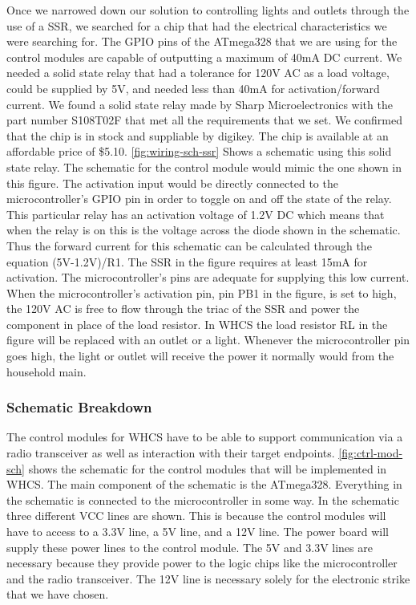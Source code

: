 Once we narrowed down our solution to controlling lights and outlets through
the use of a SSR, we searched for a chip that had the electrical
characteristics we were searching for. The GPIO pins of the ATmega328 that we
are using for the control modules are capable of outputting a maximum of 40mA
DC current. We needed a solid state relay that had a tolerance for 120V AC as a
load voltage, could be supplied by 5V, and needed less than 40mA for
activation/forward current. We found a solid state relay made by Sharp
Microelectronics with the part number S108T02F that met all the requirements
that we set. We confirmed that the chip is in stock and suppliable by digikey.
The chip is available at an affordable price of \$5.10. \autoref{fig:wiring-sch-ssr}
Shows a schematic using this solid state relay. The schematic for the control
module would mimic the one shown in this figure. The activation input would be
directly connected to the microcontroller{}'s GPIO pin in order to toggle on
and off the state of the relay. This particular relay has an activation voltage
of 1.2V DC which means that when the relay is on this is the voltage across the
diode shown in the schematic. Thus the forward current for this schematic can
be calculated through the equation (5V{}-1.2V)/R1. The SSR in the figure
requires at least 15mA for activation. The microcontroller{}'s pins are
adequate for supplying this low current. When the microcontroller{}'s
activation pin, pin PB1 in the figure, is set to high, the 120V AC is free to
flow through the triac of the SSR and power the component in place of the load
resistor. In WHCS the load resistor RL in the figure will be replaced with an
outlet or a light. Whenever the microcontroller pin goes high, the light or
outlet will receive the power it normally would from the household main.


\subsubsection{Schematic Breakdown}
The control modules for WHCS have to be able to support communication via a
radio transceiver as well as interaction with their target endpoints.
\autoref{fig:ctrl-mod-sch} shows the schematic for the control modules that will be
implemented in WHCS. The main component of the schematic is the ATmega328.
Everything in the schematic is connected to the microcontroller in some way. In
the schematic three different VCC lines are shown. This is because the control
modules will have to access to a 3.3V line, a 5V line, and a 12V line. The
power board will supply these power lines to the control module. The 5V and
3.3V lines are necessary because they provide power to the logic chips like the
microcontroller and the radio transceiver. The 12V line is necessary solely for
the electronic strike that we have chosen.

